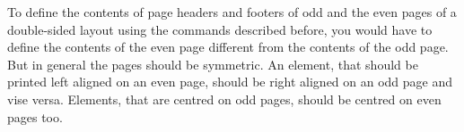 \begin{Declaration}
                \\
                \\
                \\
                \\
                \\
\end{Declaration}
%
%
%
%
%
%
To define the contents of page headers and footers of odd and the even pages
of a double-sided layout using the commands described before, you would have to
define the contents of the even page different from the contents of the odd
page. But in general the pages should be symmetric. An element, that should be
printed left aligned on an even page, should be right aligned on an odd page
and vise versa. Elements, that are centred on odd pages, should be centred on
even pages too.

